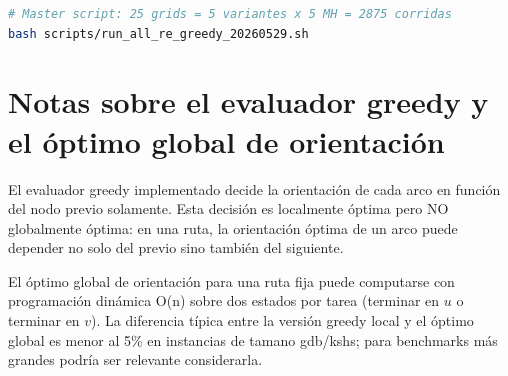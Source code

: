 \documentclass[11pt,a4paper]{article}
\theoremstyle{definition}
\theoremstyle{remark}
\begin{document}
\begin{lstlisting}[language=bash]
# Master script: 25 grids = 5 variantes x 5 MH = 2875 corridas
bash scripts/run_all_re_greedy_20260529.sh
\end{lstlisting}

\section{Notas sobre el evaluador greedy y el óptimo global de orientación}

El evaluador greedy implementado decide la orientación de cada arco en
función del nodo previo solamente. Esta decisión es localmente óptima
pero NO globalmente óptima: en una ruta, la orientación óptima de un
arco puede depender no solo del previo sino también del siguiente.

El óptimo global de orientación para una ruta fija puede computarse
con programación dinámica O(n) sobre dos estados por tarea (terminar
en $u$ o terminar en $v$). La diferencia típica entre la versión
greedy local y el óptimo global es menor al 5\% en instancias de
tamano gdb/kshs; para benchmarks más grandes podría ser relevante
considerarla.



\end{document}
